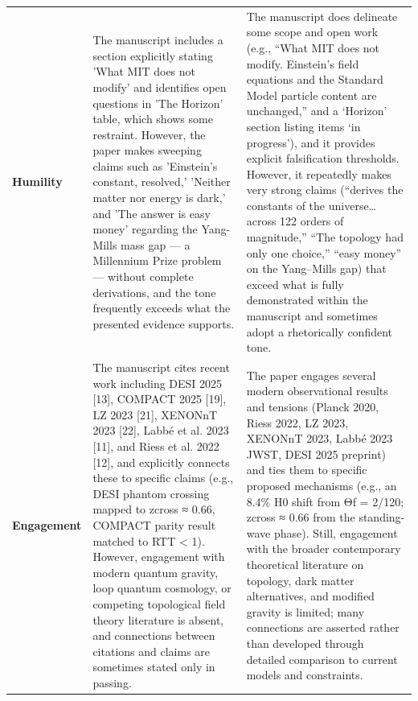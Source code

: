 \documentclass[11pt]{article}
\begin{document}
\begin{longtable}{@{} p{2.2cm} p{6.3cm} p{6.3cm} @{}}
\rowcolor{rowgray}
\textbf{Humility} &
The manuscript includes a section explicitly stating 'What MIT does not modify' and identifies open questions in 'The Horizon' table, which shows some restraint. However, the paper makes sweeping claims such as 'Einstein's constant, resolved,' 'Neither matter nor energy is dark,' and 'The answer is easy money' regarding the Yang-Mills mass gap — a Millennium Prize problem — without complete derivations, and the tone frequently exceeds what the presented evidence supports. &
The manuscript does delineate some scope and open work (e.g., “What MIT does not modify. Einstein’s field equations and the Standard Model particle content are unchanged,” and a ‘Horizon’ section listing items ‘in progress’), and it provides explicit falsification thresholds. However, it repeatedly makes very strong claims (“derives the constants of the universe… across 122 orders of magnitude,” “The topology had only one choice,” “easy money” on the Yang–Mills gap) that exceed what is fully demonstrated within the manuscript and sometimes adopt a rhetorically confident tone. \\[6pt]

\textbf{Engagement} &
The manuscript cites recent work including DESI 2025 [13], COMPACT 2025 [19], LZ 2023 [21], XENONnT 2023 [22], Labbé et al. 2023 [11], and Riess et al. 2022 [12], and explicitly connects these to specific claims (e.g., DESI phantom crossing mapped to zcross ≈ 0.66, COMPACT parity result matched to RTT < 1). However, engagement with modern quantum gravity, loop quantum cosmology, or competing topological field theory literature is absent, and connections between citations and claims are sometimes stated only in passing. &
The paper engages several modern observational results and tensions (Planck 2020, Riess 2022, LZ 2023, XENONnT 2023, Labbé 2023 JWST, DESI 2025 preprint) and ties them to specific proposed mechanisms (e.g., an 8.4\% H0 shift from Θf = 2/120; zcross ≈ 0.66 from the standing-wave phase). Still, engagement with the broader contemporary theoretical literature on topology, dark matter alternatives, and modified gravity is limited; many connections are asserted rather than developed through detailed comparison to current models and constraints. \\[6pt]


\end{longtable}
\end{document}
